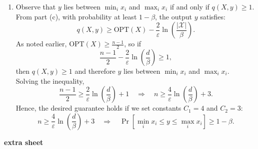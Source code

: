 \documentclass[12pt]{article}
\begin{document}
\begin{enumerate}
\begin{solution}
\begin{enumerate}
    \item[(d)] Observe that $y$ lies between $\min_i x_i$ and $\max_i x_i$ if and only if $q(X, y) \geq 1$. From part (c), with probability at least $1 - \beta$, the output $y$ satisfies:
    \[
    q(X, y) \geq \text{OPT}(X) - \frac{2}{\varepsilon} \ln\left( \frac{|\mathcal{X}|}{\beta} \right).
    \]
    As noted earlier, $\text{OPT}(X) \geq \frac{n - 1}{2}$, so if
    \[
    \frac{n - 1}{2} - \frac{2}{\varepsilon} \ln\left( \frac{d}{\beta} \right) \geq 1,
    \]
    then $q(X, y) \geq 1$ and therefore $y$ lies between $\min_i x_i$ and $\max_i x_i$.\\
    Solving the inequality,
    \[
    \frac{n - 1}{2} \geq \frac{2}{\varepsilon} \ln\left( \frac{d}{\beta} \right) + 1
    \quad \Rightarrow \quad
    n \geq \frac{4}{\varepsilon} \ln\left( \frac{d}{\beta} \right) + 3.
    \]
    Hence, the desired guarantee holds if we set constants $C_1 = 4$ and $C_2 = 3$:
    \[
    n \geq \frac{4}{\varepsilon} \ln\left( \frac{d}{\beta} \right) + 3
    \quad \Rightarrow \quad
    \Pr\left[ \min_i x_i \leq y \leq \max_i x_i \right] \geq 1 - \beta.
    \]

    
\end{enumerate}

\end{solution}


\begin{problem}
    \newpage
    {\bf extra sheet}
    \newpage
\end{problem}

\end{enumerate}
\end{document}
